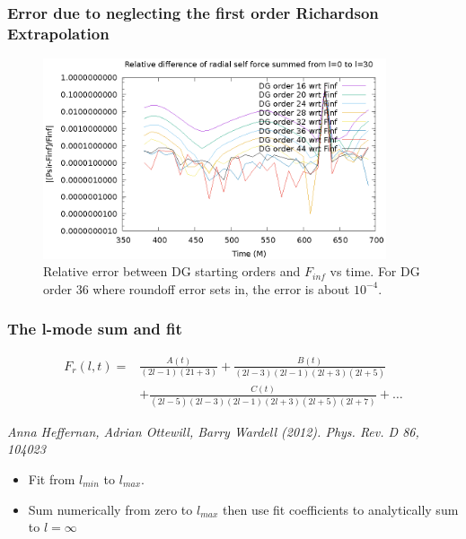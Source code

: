 \documentclass{beamer}
\begin{document}
\begin{frame}
  \frametitle{Error due to neglecting the first order Richardson Extrapolation}
  \begin{figure}
    \includegraphics[width=0.9\textwidth]{reldiffpsirvtwfinfdgorders}
    \caption{Relative error between DG starting orders and $F_{inf}$ vs time. For DG order 36 where roundoff error sets in, the error is about $10^{-4}$.}
  \end{figure}
\end{frame}

\begin{frame}
  \frametitle{The l-mode sum and fit}
  \begin{eqnarray}
    F_r(l,t)=&\frac{A(t)}{(2l-1)(21+3)}+\frac{B(t)}{(2l-3)(2l-1)(2l+3)(2l+5)}\nonumber \\
    &+\frac{C(t)}{(2l-5)(2l-3)(2l-1)(2l+3)(2l+5)(2l+7)}+\ldots
  \end{eqnarray}

   {\em Anna Heffernan, Adrian Ottewill, Barry Wardell (2012). Phys. Rev. D 86, 104023}

  \begin{itemize}
  \item Fit from $l_{min}$ to $l_{max}$.
  \item Sum numerically from zero to $l_{max}$ then use fit coefficients to analytically sum to $l=\infty$

  \end{itemize}
\end{frame}
\end{document}
